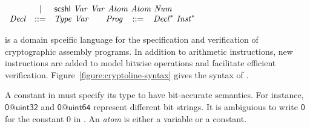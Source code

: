 \begin{figure*}
\begin{math}
\begin{array}{rclclcl}
      & | & \clSCShl\ \mathit{Var}\ \mathit{Var}\
            \mathit{Atom}\ \mathit{Atom}\ \mathit{Num}\\
      \mathit{Decl} & ::= &
        \multicolumn{2}{l}{\mathit{Type}\ \mathit{Var}}
      &&
      \multicolumn{2}{l}{
         \mathit{Prog} \hspace{2ex} ::=\hspace{2ex}
         \mathit{Decl}^*\ \mathit{Inst}^*
      }
    \end{array}
  \end{math}
  \caption{\cryptoline Syntax}
  \label{figure:cryptoline-syntax}
\end{figure*}

\cryptoline is a domain spceific language for the specification and
verification of cryptographic assembly programs. In addition to
arithmetic instructions, new instructions are added to model bitwise
operations and facilitate efficient verification.
Figure~\ref{figure:cryptoline-syntax} gives the syntax of \cryptoline.

A constant in \cryptoline must specify its type to have bit-accurate
semantics. For instance, $\mathsf{0@uint32}$ and $\mathsf{0@uint64}$
represent different bit strings. It is ambiguious to write
$\mathsf{0}$ for the constant $0$ in \cryptoline. An \emph{atom} is
either a variable or a constant.
